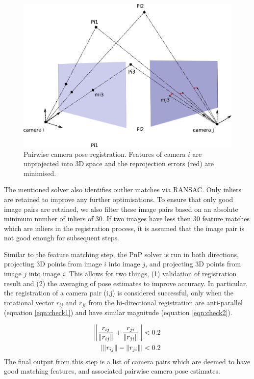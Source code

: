 \documentclass[10pt,twocolumn,letterpaper]{article}
\newcommand{\norm}[1]{\left\lVert #1 \right\rVert}
\DeclarePairedDelimiter\abs{\lvert}{\rvert}
\begin{document}
\begin{figure}[t]
\begin{center}
   \includegraphics[width=0.9\linewidth]{figures/registration.pdf}
\end{center}
\caption{Pairwise camera pose registration. Features of camera $i$ are unprojected into 3D space and the reprojection errors (red) are minimised.}
\label{fig:reg}
\end{figure}

The mentioned solver also identifies outlier matches via RANSAC. Only inliers
are retained to improve any further optimisations. To ensure that only good
image pairs are retained, we also filter these image pairs based on an absolute
minimum number of inliers of 30. If two images have less then 30 feature matches
which are inliers in the registration process, it is assumed that the image pair
is not good enough for subsequent steps.

Similar to the feature matching step, the PnP solver is run in both directions,
projecting 3D points from image $i$ into image $j$, and projecting 3D points
from image $j$ into image $i$. This allows for two things, (1) validation of registration result and (2) the averaging of
pose estimates to improve accuracy. In particular, the registration of a camera pair (i,j) is considered successful, only when the rotational vector $r_{ij}$ and $r_{ji}$ from the bi-directional registration are anti-parallel (equation \ref{eqn:check1}) and have similar magnitude (equation \ref{eqn:check2}).

\begin{align}
\norm{\frac{r_{ij}}{\norm{r_{ij}}} + \frac{r_{ji}}{\norm{r_{ji}}}} < 0.2
\label{eqn:check1}\\
\abs{\norm{r_{ij}} - \norm{r_{ji}}} < 0.2\label{eqn:check2}
\end{align}
The final output from this step is a list of camera pairs which are deemed to
have good matching features, and associated pairwise camera pose estimates.
\end{document}
